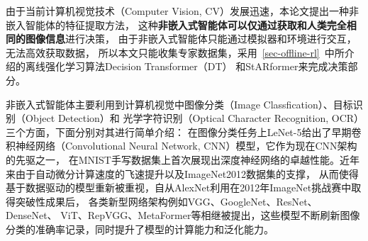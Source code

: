 由于当前计算机视觉技术（Computer Vision, CV）发展迅速，本论文提出一种非嵌入智能体的特征提取方法，
这种\textbf{非嵌入式智能体可以仅通过获取和人类完全相同的图像信息}进行决策，
由于非嵌入式智能体只能通过模拟器和环境进行交互，无法高效获取数据，
所以本文只能收集专家数据集，采用~\ref{sec-offline-rl}~中所介绍的离线强化学习算法Decision Transformer（DT）
和StARformer来完成决策部分。

非嵌入式智能体主要利用到计算机视觉中图像分类（Image Classfication）、目标识别（Object Detection）和
光学字符识别（Optical Character Recognition, OCR）三个方面，下面分别对其进行简单介绍：
在图像分类任务上LeNet-5给出了早期卷积神经网络（Convolutional Neural Network, CNN）模型，它作为现在CNN架构的先驱之一，
在MNIST手写数据集上首次展现出深度神经网络的卓越性能。近年来由于自动微分计算速度的飞速提升以及ImageNet2012数据集的支撑，
从而使得基于数据驱动的模型重新被重视，自从AlexNet利用在2012年ImageNet挑战赛中取得突破性成果后，
各类新型网络架构例如VGG、GoogleNet、ResNet、DenseNet、
ViT、RepVGG、MetaFormer等相继被提出，这些模型不断刷新图像分类的准确率记录，同时提升了模型的计算能力和泛化能力。


